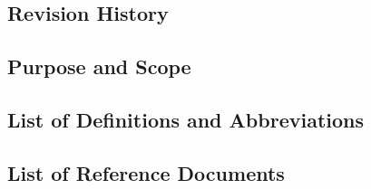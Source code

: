 \subsection{Revision History}

\subsection{Purpose and Scope}

\subsection{List of Definitions and Abbreviations}

\subsection{List of Reference Documents}
